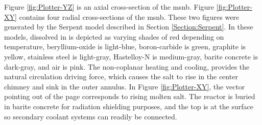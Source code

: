 Figure \ref{fig:Plotter-YZ} is an axial cross-section of the \acs{msnb}. Figure \ref{fig:Plotter-XY} contains four radial cross-sections of the \acs{msnb}. These two figures were generated by the Serpent model described in Section \ref{Section:Serpent}. In these models, \UF dissolved in \flinak is depicted as varying shades of red depending on temperature, beryllium-oxide is light-blue, boron-carbide is green, graphite is yellow, stainless steel is light-gray, Hastelloy-N is medium-gray, barite concrete is dark-gray, and air is pink. The non-coplanar heating and cooling, provides the natural circulation driving force, which causes the salt to rise in the center chimney and sink in the outer annulus. In Figure \ref{fig:Plotter-XY}, the vector pointing out of the page corresponds to rising molten salt. The reactor is buried in barite concrete for radiation shielding purposes, and the top is at the surface so secondary coolant systems can readily be connected.

